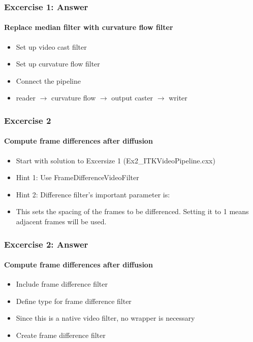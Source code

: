 {
\begin{frame}[fragile]
\frametitle{Excercise 1: Answer}
\framesubtitle{Replace median filter with curvature flow filter}
\begin{itemize}
\item Set up video cast filter
\pause

\item Set up curvature flow filter
\pause

\item Connect the pipeline
\item reader $\rightarrow$ curvature
  flow $\rightarrow$ output caster $\rightarrow$ writer
\end{itemize}
\end{frame}
}


{
\begin{frame}[fragile]
\frametitle{Excercise 2}
\framesubtitle{Compute frame differences after diffusion}
\begin{itemize}
\item Start with solution to Excersize 1 (Ex2\_ITKVideoPipeline.cxx)
\pause

\item Hint 1: Use FrameDifferenceVideoFilter
\pause

\item Hint 2: Difference filter's important parameter is:
\item This sets the spacing of the frames to be differenced. Setting
  it to 1 means adjacent frames will be used.
\end{itemize}
\end{frame}
}

{
\begin{frame}[fragile]
\frametitle{Excercise 2: Answer}
\framesubtitle{Compute frame differences after diffusion}
\begin{itemize}
\item Include frame difference filter
\pause

\item Define type for frame difference filter
\item Since this is a native video filter, no wrapper is necessary
\pause

\item Create frame difference filter
\end{itemize}
\end{frame}
}

